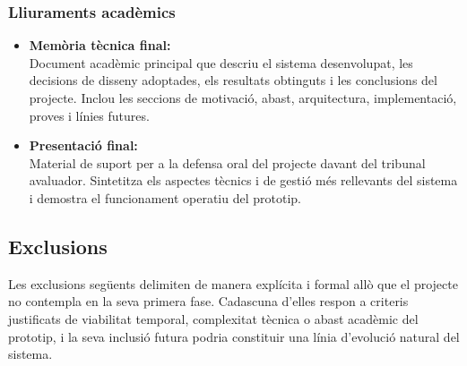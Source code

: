 \subsubsection{Lliuraments acadèmics}
\begin{itemize}
    \item \textbf{Memòria tècnica final:} \\ Document acadèmic principal que descriu el sistema desenvolupat, les decisions de disseny adoptades, els resultats obtinguts i les conclusions del projecte. Inclou les seccions de motivació, abast, arquitectura, implementació, proves i línies futures.
    
    \item \textbf{Presentació final:} \\ Material de suport per a la defensa oral del projecte davant del tribunal avaluador. Sintetitza els aspectes tècnics i de gestió més rellevants del sistema i demostra el funcionament operatiu del prototip.
\end{itemize}

\subsection{Exclusions}

Les exclusions següents delimiten de manera explícita i formal allò que el projecte no contempla en la seva primera fase. 
Cadascuna d'elles respon a criteris justificats de viabilitat temporal, complexitat tècnica o abast acadèmic del prototip, i la seva inclusió futura podria constituir una línia d'evolució natural del sistema.

